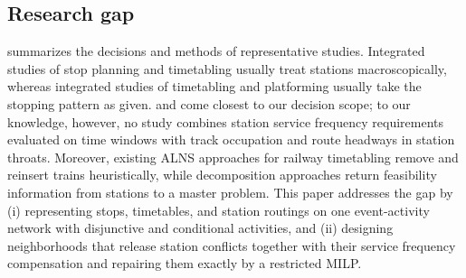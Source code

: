 \subsection{Research gap}
 summarizes the decisions and methods of representative studies. Integrated studies of stop planning and timetabling usually treat stations macroscopically, whereas integrated studies of timetabling and platforming usually take the stopping pattern as given. \citet{Xu2021} and \citet{Ji2024} come closest to our decision scope; to our knowledge, however, no study combines station service frequency requirements evaluated on time windows with track occupation and route headways in station throats. Moreover, existing ALNS approaches for railway timetabling remove and reinsert trains heuristically, while decomposition approaches return feasibility information from stations to a master problem. This paper addresses the gap by (i) representing stops, timetables, and station routings on one event-activity network with disjunctive and conditional activities, and (ii) designing neighborhoods that release station conflicts together with their service frequency compensation and repairing them exactly by a restricted MILP.

